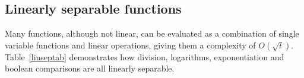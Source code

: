 \documentclass{article}
\begin{document}


    \subsection{Linearly separable functions}
        \label{linsep}
        Many functions, although not linear, can be evaluated as a combination of single variable functions and linear operations,
        giving them a complexity of $O(\sqrt{t})$.
        Table~\ref{linseptab} demonstrates how division, logarithms, exponentiation and boolean comparisons are all linearly separable.
\end{document}
